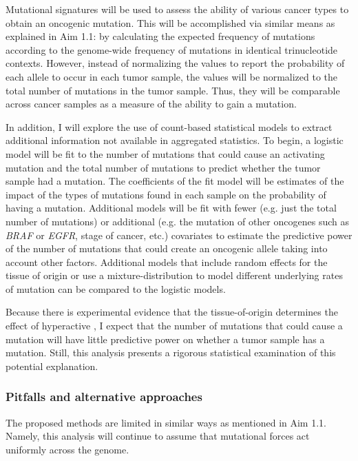 Mutational signatures will be used to assess the ability of various cancer types to obtain an oncogenic \KRAS{} mutation.
This will be accomplished via similar means as explained in Aim 1.1: by calculating the expected frequency of \KRAS{} mutations according to the genome-wide frequency of mutations in identical trinucleotide contexts.
However, instead of normalizing the values to report the probability of each allele to occur in each tumor sample, the values will be normalized to the total number of mutations in the tumor sample.
Thus, they will be comparable across cancer samples as a measure of the ability to gain a \KRAS{} mutation.

In addition, I will explore the use of count-based statistical models to extract additional information not available in aggregated statistics.
To begin, a logistic model will be fit to the number of mutations that could cause an activating \KRAS{} mutation and the total number of mutations to predict whether the tumor sample had a \KRAS{} mutation.
The coefficients of the fit model will be estimates of the impact of the types of mutations found in each sample on the probability of having a \KRAS{} mutation.
Additional models will be fit with fewer (e.g. just the total number of mutations) or additional (e.g. the mutation of other oncogenes such as \emph{BRAF} or \emph{EGFR}, stage of cancer, etc.) covariates to estimate the predictive power of the number of mutations that could create an oncogenic \KRAS{} allele taking into account other factors.
Additional models that include random effects for the tissue of origin or use a mixture-distribution to model different underlying rates of mutation can be compared to the logistic models.

Because there is experimental evidence that the tissue-of-origin determines the effect of hyperactive \kras{}, I expect that the number of mutations that could cause a \KRAS{} mutation will have little predictive power on whether a tumor sample has a \KRAS{} mutation.
Still, this analysis presents a rigorous statistical examination of this potential explanation.

\subsubsection*{Pitfalls and alternative approaches}

The proposed methods are limited in similar ways as mentioned in Aim 1.1.
Namely, this analysis will continue to assume that mutational forces act uniformly across the genome.

